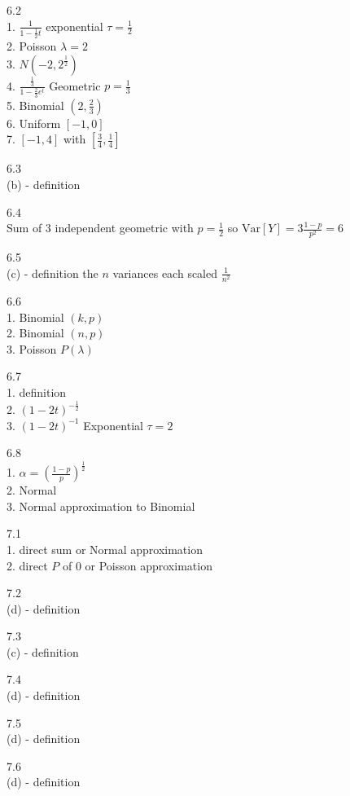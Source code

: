 6.2 \\
1. $\frac{1}{1-\frac{1}{2} t}$ exponential $\tau=\frac{1}{2}$ \\
2. Poisson $\lambda=2$ \\
3. $N(-2,2^{\frac{1}{2}})$ \\
4. $\frac{\frac{1}{3}}{1-\frac{2}{3} e^t}$ Geometric $p=\frac{1}{3}$ \\
5. Binomial $(2,\frac{2}{3})$ \\
6. Uniform $[-1,0]$ \\
7. $[-1,4]$ with $[\frac{3}{4},\frac{1}{4}]$

6.3 \\
(b) - definition

6.4 \\
Sum of $3$ independent geometric with $p=\frac{1}{2}$ so $\text{Var}[Y]=3 \frac{1-p}{p^2}=6$

6.5 \\
(c) - definition the $n$ variances each scaled $\frac{1}{n^2}$

6.6 \\
1. Binomial $(k,p)$ \\
2. Binomial $(n,p)$ \\
3. Poisson $P(\lambda)$

6.7 \\
1. definition \\
2. $(1-2t)^{-\frac{1}{2}}$ \\
3. $(1-2t)^{-1}$ Exponential $\tau=2$

6.8 \\
1. $\alpha=(\frac{1-p}{p})^{\frac{1}{2}}$ \\
2. Normal \\
3. Normal approximation to Binomial

\newpage

7.1 \\
1. direct sum or Normal approximation \\
2. direct $P$ of $0$ or Poisson approximation

7.2 \\
(d) - definition

7.3 \\
(c) - definition

7.4 \\
(d) - definition

7.5 \\
(d) - definition

7.6 \\
(d) - definition

